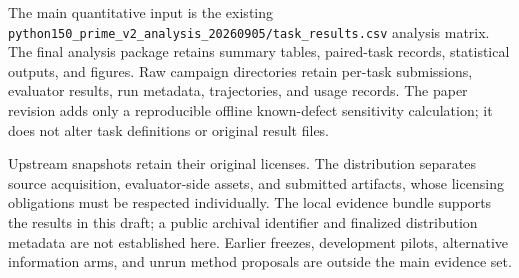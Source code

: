\documentclass[acmsmall,screen,review,anonymous]{acmart}
\begin{document}
The main quantitative input is the existing
\texttt{python150\_prime\_v2\_analysis\_20260905/task\_results.csv} analysis
matrix. The final analysis package retains summary tables, paired-task records,
statistical outputs, and figures. Raw campaign directories retain per-task
submissions, evaluator results, run metadata, trajectories, and usage records.
The paper revision adds only a reproducible offline known-defect sensitivity
calculation; it does not alter task definitions or original result files.

Upstream snapshots retain their original licenses. The distribution separates
source acquisition, evaluator-side assets, and submitted artifacts, whose
licensing obligations must be respected individually. The local evidence bundle
supports the results in this draft; a public archival identifier and finalized
distribution metadata are not established here. Earlier freezes, development
pilots, alternative information arms, and unrun method proposals are outside the
main evidence set.
\end{document}
